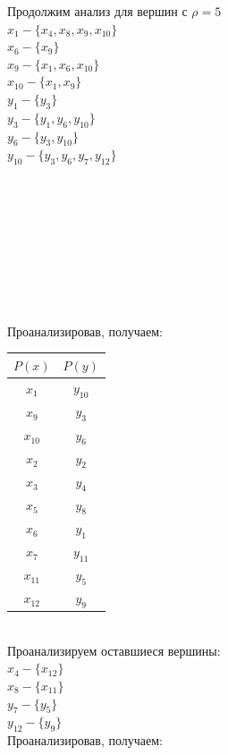 \documentclass[12pt,a4paper]{report}
\begin{document}
\hfill\break
Продолжим анализ для вершин с $\rho=5$\\
$x_1-\{x_4,x_8,x_9,x_{10}\}$\\
$x_6-\{x_9\}$\\
$x_9-\{x_1,x_6,x_{10}\}$\\
$x_{10}-\{x_1,x_9\}$\\
$y_1-\{y_3\}$\\
$y_3-\{y_1,y_6,y_{10}\}$\\
$y_6-\{y_3,y_{10}\}$\\
$y_{10}-\{y_3,y_6,y_7,y_{12}\}$\\
\\\\\\\\\\\\\\\\\\
Проанализировав, получаем: \\
\hfill\break
\begin{tabular}{|c|c|}
    \hline
    $P(x)$ & $P(y)$ \\
    \hline
    $x_1$ & $y_{10}$ \\
    \hline
    $x_9$ & $y_3$ \\
    \hline
    $x_{10}$ & $y_6$ \\
    \hline
    \hline
    $x_2$ & $y_2$ \\
    \hline
    $x_3$ & $y_4$ \\
    \hline
    $x_{5}$ & $y_8$ \\
    \hline
    $x_6$ & $y_1$ \\
    \hline
    $x_7$ & $y_{11}$ \\
    \hline
    $x_{11}$ & $y_5$ \\
    \hline
    $x_{12}$ & $y_9$ \\
    \hline
\end{tabular}\\
\hfill\break
Проанализируем оставшиеся вершины: \\
$x_4-\{x_{12}\}$\\
$x_8-\{x_{11}\}$\\
$y_7-\{y_5\}$\\
$y_{12}-\{y_9\}$\\
Проанализировав, получаем: \\
\hfill\break
\end{document}
